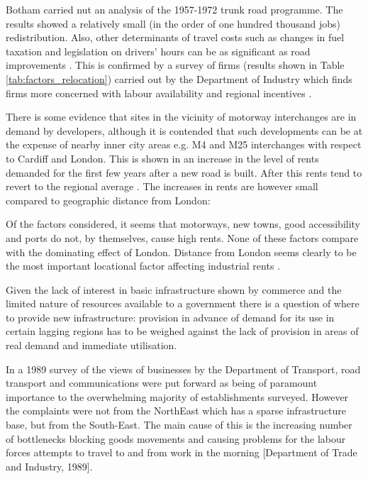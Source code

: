 Botham carried nut an analysis of the 1957-1972 trunk road programme. The results showed a relatively small (in the order of one hundred thousand jobs) redistribution. Also, other determinants of travel costs such as changes in fuel taxation and legislation on drivers' hours can be as significant as road improvements \cite{Botham:1980}. This is confirmed by a survey of firms (results shown in Table \ref{tab:factors_relocation}) carried out by the Department of Industry which finds firms more concerned with labour availability and regional incentives \cite{Maarquand:1980}.



There is some evidence that sites in the vicinity of motorway interchanges are in demand by developers, although it is contended that such developments can be at the expense of nearby inner city areas e.g. M4 and M25 interchanges with respect to Cardiff and London. This is shown in an increase in the level of rents demanded for the first few years after a new road is built. After this rents tend to revert to the regional average \cite{Hillier:1979}. The increases in rents are however small compared to geographic distance from London:

\begin{displayquote}
Of the factors considered, it seems that motorways, new towns, good accessibility and ports do not, by themselves, cause high rents. None of these factors compare with the dominating effect of London. Distance from London seems clearly to be the most important locational factor affecting industrial rents \cite{Hillier:1980}.
\end{displayquote}

Given the lack of interest in basic infrastructure shown by commerce and the limited nature of resources available to a government there is a question of where to provide new infrastructure: provision in advance of demand for its use in certain lagging regions has to be weighed against the lack of provision in areas of real demand and immediate utilisation.

In a 1989 survey of the views of businesses by the Department of Transport, road transport and communications were put forward as being of paramount importance to the overwhelming majority of establishments surveyed. However the complaints were not from the NorthEast which has a sparse infrastructure base, but from the South-East. The main cause of this is the increasing number of bottlenecks blocking goods movements and causing problems for the labour forces attempts to travel to and from work in the morning [Department of Trade and Industry, 1989].

